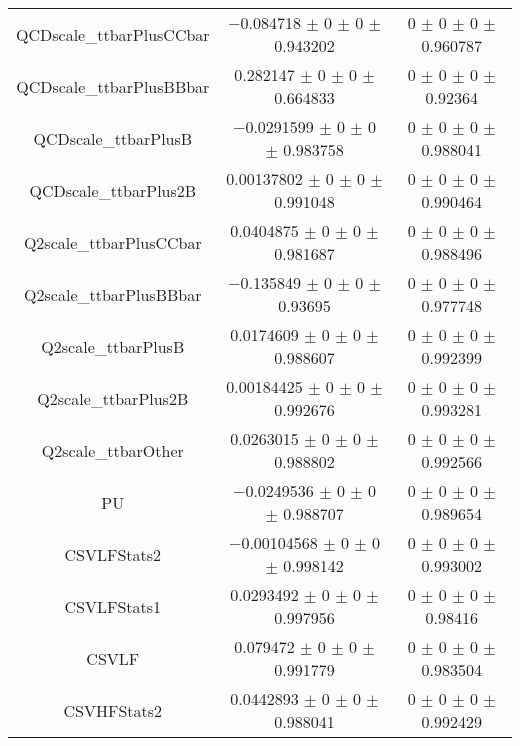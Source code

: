\begin{table}
\begin{tabular}{ccc}
QCDscale\_ttbarPlusCCbar 	& \num{-0.084718} $\pm$ \num{0} $\pm$ \num{0} $\pm$ \num{0.943202} 	& \num{0} $\pm$ \num{0} $\pm$ \num{0} $\pm$ \num{0.960787}\\
QCDscale\_ttbarPlusBBbar 	& \num{0.282147} $\pm$ \num{0} $\pm$ \num{0} $\pm$ \num{0.664833} 	& \num{0} $\pm$ \num{0} $\pm$ \num{0} $\pm$ \num{0.92364}\\
QCDscale\_ttbarPlusB 	& \num{-0.0291599} $\pm$ \num{0} $\pm$ \num{0} $\pm$ \num{0.983758} 	& \num{0} $\pm$ \num{0} $\pm$ \num{0} $\pm$ \num{0.988041}\\
QCDscale\_ttbarPlus2B 	& \num{0.00137802} $\pm$ \num{0} $\pm$ \num{0} $\pm$ \num{0.991048} 	& \num{0} $\pm$ \num{0} $\pm$ \num{0} $\pm$ \num{0.990464}\\
Q2scale\_ttbarPlusCCbar 	& \num{0.0404875} $\pm$ \num{0} $\pm$ \num{0} $\pm$ \num{0.981687} 	& \num{0} $\pm$ \num{0} $\pm$ \num{0} $\pm$ \num{0.988496}\\
Q2scale\_ttbarPlusBBbar 	& \num{-0.135849} $\pm$ \num{0} $\pm$ \num{0} $\pm$ \num{0.93695} 	& \num{0} $\pm$ \num{0} $\pm$ \num{0} $\pm$ \num{0.977748}\\
Q2scale\_ttbarPlusB 	& \num{0.0174609} $\pm$ \num{0} $\pm$ \num{0} $\pm$ \num{0.988607} 	& \num{0} $\pm$ \num{0} $\pm$ \num{0} $\pm$ \num{0.992399}\\
Q2scale\_ttbarPlus2B 	& \num{0.00184425} $\pm$ \num{0} $\pm$ \num{0} $\pm$ \num{0.992676} 	& \num{0} $\pm$ \num{0} $\pm$ \num{0} $\pm$ \num{0.993281}\\
Q2scale\_ttbarOther 	& \num{0.0263015} $\pm$ \num{0} $\pm$ \num{0} $\pm$ \num{0.988802} 	& \num{0} $\pm$ \num{0} $\pm$ \num{0} $\pm$ \num{0.992566}\\
PU 	& \num{-0.0249536} $\pm$ \num{0} $\pm$ \num{0} $\pm$ \num{0.988707} 	& \num{0} $\pm$ \num{0} $\pm$ \num{0} $\pm$ \num{0.989654}\\
CSVLFStats2 	& \num{-0.00104568} $\pm$ \num{0} $\pm$ \num{0} $\pm$ \num{0.998142} 	& \num{0} $\pm$ \num{0} $\pm$ \num{0} $\pm$ \num{0.993002}\\
CSVLFStats1 	& \num{0.0293492} $\pm$ \num{0} $\pm$ \num{0} $\pm$ \num{0.997956} 	& \num{0} $\pm$ \num{0} $\pm$ \num{0} $\pm$ \num{0.98416}\\
CSVLF 	& \num{0.079472} $\pm$ \num{0} $\pm$ \num{0} $\pm$ \num{0.991779} 	& \num{0} $\pm$ \num{0} $\pm$ \num{0} $\pm$ \num{0.983504}\\
CSVHFStats2 	& \num{0.0442893} $\pm$ \num{0} $\pm$ \num{0} $\pm$ \num{0.988041} 	& \num{0} $\pm$ \num{0} $\pm$ \num{0} $\pm$ \num{0.992429}\\

\end{tabular}
\end{table}
